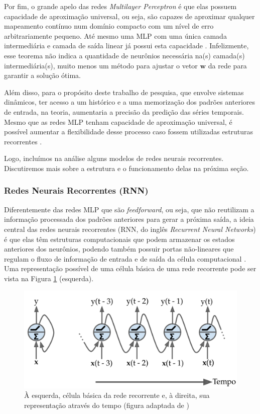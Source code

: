 \documentclass[a4paper, 12pt]{article}
\begin{document}
Por fim, o grande apelo das redes \textit{Multilayer Perceptron} é que elas possuem capacidade de aproximação universal, ou seja, são capazes de aproximar qualquer mapeamento contínuo num domínio compacto com um nível de erro arbitrariamente pequeno. Até mesmo uma MLP com uma única camada intermediária e camada de saída linear já possui esta capacidade \cite{cybenko1989approximation, hornik1989multilayer}. Infelizmente, esse teorema não indica a quantidade de neurônios necessária na(s) camada(s) intermediária(s), muito menos um método para ajustar o vetor $\mathbf{w}$ da rede para garantir a solução ótima.

Além disso, para o propósito deste trabalho de pesquisa, que envolve sistemas dinâmicos, ter acesso a um histórico e a uma memorização dos padrões anteriores de entrada, na teoria, aumentaria a precisão da predição das séries temporais. Mesmo que as redes MLP tenham capacidade de aproximação universal, é possível aumentar a flexibilidade desse processo caso fossem utilizadas estruturas recorrentes \cite{connor1994recurrent, boccato2013novas}.

Logo, incluímos na análise alguns modelos de redes neurais recorrentes. Discutiremos mais sobre a estrutura e o funcionamento delas na próxima seção.

\subsubsection{Redes Neurais Recorrentes (RNN)} 
Diferentemente das redes MLP que são \textit{feedforward}, ou seja, que não reutilizam a informação processada dos padrões anteriores para gerar a próxima saída, a ideia central das redes neurais recorrentes (RNN, do inglês \textit{Recurrent Neural Networks}) é que elas têm estruturas computacionais que podem armazenar os estados anteriores dos neurônios, podendo também possuir portas não-lineares que regulam o fluxo de informação de entrada e de saída da célula computacional \cite{haykin2010neural}. Uma representação possível de uma célula básica de uma rede recorrente pode ser vista na Figura \ref{fig:recorrente-cell} (esquerda).
\begin{figure}[H]
\centering
\includegraphics[scale = 0.2]{rnn-cell.pdf}
\caption{À esquerda, célula básica da rede recorrente e, à direita, sua representação através do tempo (figura adaptada de \cite{geron2019hands})}
\label{fig:recorrente-cell}
\end{figure}
\end{document}
